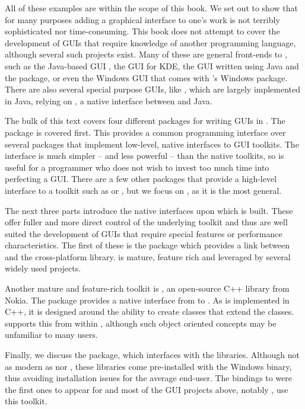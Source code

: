 All of these examples are within the scope of this book. We set out to
show that for many purposes adding a graphical interface to one's work
is not terribly sophisticated nor time-consuming.  This book does not
attempt to cover the development of GUIs that require knowledge of
another programming language, although several such projects
exist. Many of these are general front-ends to \R\/, such as the
Java-based GUI , the  GUI for KDE, the
 GUI written using Java and the  package, or
even the Windows GUI that comes with \R's Windows package. There are
also several special purpose GUIs, like , which are
largely implemented in Java, relying on , a native
interface between \R\/ and Java.

The bulk of this text covers four different packages for writing GUIs
in \R. The  package is covered first. This provides a
common programming interface over several \R\/ packages that implement
low-level, native interfaces to GUI toolkits. The 
interface is much simpler -- and less powerful -- than the native
toolkits, so is useful for a programmer who does not wish to invest
too much time into perfecting a GUI. There are a few other packages
that provide a high-level \R\/ interface to a toolkit such as
 or , but we focus on , as
it is the most general.


The next three parts introduce the native interfaces upon which
 is built. These offer fuller and more direct control of
the underlying toolkit and thus are well suited the development of GUIs
that require special features or performance characteristics.  The
first of these is the  package which provides a link
between \R\/ and the cross-platform \GTK\/ library. \GTK\/ is mature,
feature rich and leveraged by several widely used
projects. 

Another mature and feature-rich toolkit is \Qt, an open-source C++ library
from Nokia. The \R\/ package  provides a native interface
from \R\/ to \Qt.  As \Qt\/ is implemented in C++, it is designed
around the ability to create classes that extend the \Qt\/
classes.  supports this from within \R\/, although such
object oriented concepts may be unfamiliar to many \R\/ users.

Finally, we discuss the  package, which interfaces with the
\TK\/ libraries. Although not as modern as \GTK\/ nor \Qt, these
libraries come pre-installed with the Windows binary, thus avoiding
installation issues for the average end-user. The bindings to \TK\/
were the first ones to appear for \R\/ and most of the GUI projects
above, notably , use this toolkit.

